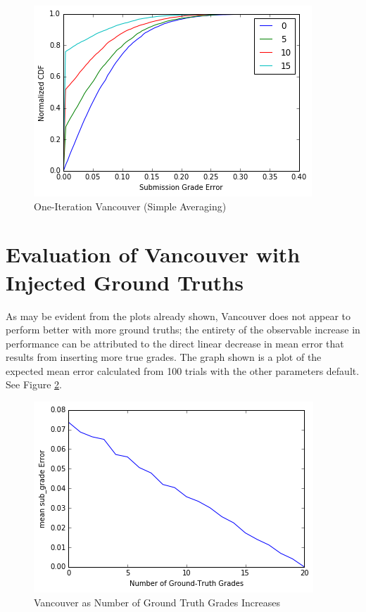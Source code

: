 \documentclass{article}
\begin{document}
	\begin{figure}[h]
		\includegraphics{vancouver-1-step.png}
		\caption{One-Iteration Vancouver (Simple Averaging)}
		\label{fig:vancouver-1-step}
	\end{figure}
	

	\section{Evaluation of Vancouver with Injected Ground Truths}
	As may be evident from the plots already shown, Vancouver does not appear to perform better with more ground truths; the entirety of the observable increase in performance can be attributed to the direct linear decrease in mean error that results from inserting more true grades. The graph shown is a plot of the expected mean error calculated from 100 trials with the other parameters default. See Figure \ref{fig:vancouver-vs-ground-truth-cover}.
	
	\begin{figure}[h]
		\includegraphics{vancouver-vs-ground-truth-cover.png}
		\caption{Vancouver as Number of Ground Truth Grades Increases}
		\label{fig:vancouver-vs-ground-truth-cover}
	\end{figure}
	
\end{document}
